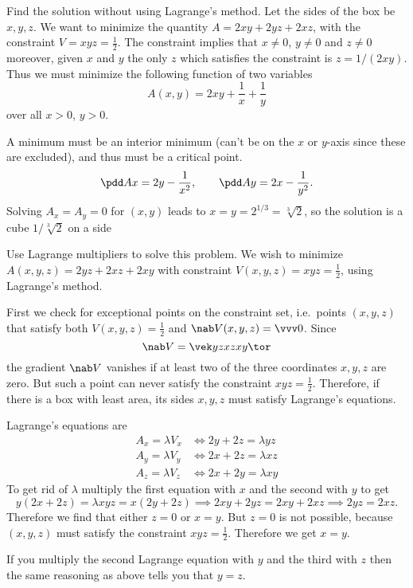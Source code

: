 \begin{multicols}{2}
\subprob Find the solution without using Lagrange's method. 
\answer  
Let the sides of the box be $x,y,z$.  We want to minimize the quantity $A =
2xy+2yz+2xz$, with the constraint $V=xyz=\frac12$.  The constraint implies that
$x\neq0$, $y\neq0$ and $z\neq0$ moreover, given $x$ and $y$ the only $z$
which satisfies the constraint is $z=1/(2xy)$.  Thus we must minimize the
following function of two variables
\[
A(x,y) = 2xy + \frac{1} {x} + \frac{1} {y}
\]
over all $x>0$, $y>0$.

A minimum must be an interior minimum (can't be on the $x$ or $y$-axis
since these are excluded), and thus must be a critical point.
\[
\pdd Ax = 2y-\frac{1} {x^2}, \qquad
\pdd Ay = 2x - \frac{1} {y^2}.
\]
Solving $A_x=A_y=0$ for $(x,y)$ leads to $x=y=2^{1/3} = \sqrt[3]2$, so the solution
is a cube $1/\sqrt[3]{2}$ on a side
\endanswer

\subprob Use Lagrange multipliers to solve this problem. 
\answer 
We wish to minimize $A(x,y,z) = 2yz+2xz+2xy$ with constraint
$V(x, y, z) = xyz = \frac12$, using Lagrange's method.

First we check for exceptional points on the constraint set, i.e.\
points $(x,y,z)$ that satisfy both $V(x, y, z) = \frac12 $ and
$\nab V(x, y, z) = \vvv0$.  Since 
\[
\nab V = \vek yz \\ xz\\ xy\tor
\]
the gradient $\nab V$ vanishes if at least two of the three
coordinates $x, y, z$ are zero.  But such a point can never satisfy
the constraint $xyz=\tfrac12$.  Therefore, if there is a box with
least area, its sides $x, y, z$ must satisfy Lagrange's equations.

Lagrange's equations are
\begin{align*}
  A_x = \lambda V_x &\iff 2y+2z = \lambda yz\\
  A_y = \lambda V_y &\iff 2x+2z = \lambda xz\\
  A_z = \lambda V_z &\iff 2x+2y = \lambda xy
\end{align*}
To get rid of $\lambda$ multiply the first equation with $x$ and the
second with $y$ to get
\[
y(2x+2z) = \lambda xyz = x(2y+2z) \implies
2xy+2yz = 2xy+2xz \implies 2yz=2xz.
\]
Therefore we find that either $z=0$ or $x=y$.  
But $z=0$ is not possible, because $(x,y,z)$ must satisfy the
constraint $xyz=\frac12$.  Therefore we get $x=y$.

If you multiply the second Lagrange equation with $y$ and the third
with $z$ then the same reasoning as above tells you that $y=z$.


\end{multicols}
